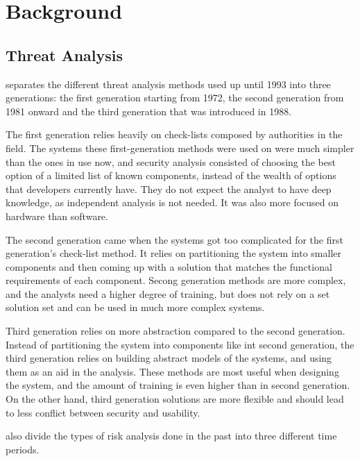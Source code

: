 \chapter{Background}
\label{chapter:background} 

\section{Threat Analysis}

\citet{threat_analysis_1993} separates the different threat analysis methods used up until 1993 into three generations: the first generation starting from 1972, the second generation from 1981 onward and the third generation that was introduced in 1988.

The first generation relies heavily on check-lists composed by authorities in the field. 
The systems these first-generation methods were used on were much simpler than the ones in use now, and security analysis consisted of choosing the best option of a limited list of known components, instead of the wealth of options that developers currently have.
They do not expect the analyst to have deep knowledge, as independent analysis is not needed.
It was also more focused on hardware than software. \cite{threat_analysis_1993}

The second generation came when the systems got too complicated for the first generation's check-list method. 
It relies on partitioning the system into smaller components and then coming up with a solution that matches the functional requirements of each component.
Secong generation methods are more complex, and the analysts need a higher degree of training, but does not rely on a set solution set and can be used in much more complex systems. \cite{threat_analysis_1993}

Third generation relies on more abstraction compared to the second generation. 
Instead of partitioning the system into components like int second generation, the third generation relies on building abstract models of the systems, and using them as an aid in the analysis.
These methods are most useful when designing the system, and the amount of training is even higher than in second generation.
On the other hand, third generation solutions are more flexible and should lead to less conflict between security and usability. \cite{threat_analysis_1993}

\citet{risk_analysis_to_security_requirements} also divide the types of risk analysis done in the past into three different time periods.

